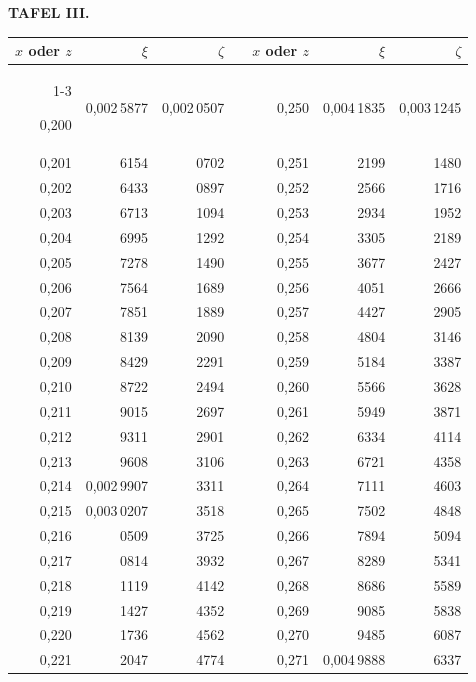\endgroup
\clearpage
{}
\begingroup
\centering
\fontsize{9}{9}\selectfont
\setlength{\tabcolsep}{8pt}
\renewcommand{\arraystretch}{1}
\setlength{\parskip}{0pt}
\textbf{TAFEL III.}
\par\vspace{7pt}
\begin{tabular}{|r|r|r|@{}p{9pt}@{}|r|r|r|}
\hline
\rule{0pt}{8.5pt}\(x\) oder \(z\) & \(\xi\) & \(\zeta\) & & \(x\) oder \(z\) & \(\xi\) & \(\zeta\) \\
\cline{1-3}\cline{5-7}
\rule{0pt}{8.5pt}0,200 & 0,002\,5877 & 0,002\,0507 &  & 0,250 & 0,004\,1835 & 0,003\,1245 \\
0,201 & 6154 & 0702 &  & 0,251 & 2199 & 1480 \\
0,202 & 6433 & 0897 &  & 0,252 & 2566 & 1716 \\
0,203 & 6713 & 1094 &  & 0,253 & 2934 & 1952 \\
0,204 & 6995 & 1292 &  & 0,254 & 3305 & \llap{\raisebox{1.6ex}{.}\hspace{.1em}}2189 \\
0,205 & 7278 & 1490 &  & 0,255 & 3677 & 2427 \\[3pt]
0,206 & 7564 & 1689 &  & 0,256 & 4051 & 2666 \\
0,207 & 7851 & 1889 &  & 0,257 & 4427 & 2905 \\
0,208 & 8139 & 2090 &  & 0,258 & 4804 & 3146 \\
0,209 & 8429 & 2291 &  & 0,259 & 5184 & 3387 \\
0,210 & 8722 & 2494 &  & 0,260 & 5566 & 3628 \\[3pt]
0,211 & 9015 & 2697 &  & 0,261 & 5949 & 3871 \\
0,212 & 9311 & 2901 &  & 0,262 & 6334 & 4114 \\
0,213 & 9608 & 3106 &  & 0,263 & 6721 & 4358 \\
0,214 & 0,002\,9907 & 3311 &  & 0,264 & 7111 & 4603 \\
0,215 & 0,003\,0207 & 3518 &  & 0,265 & 7502 & 4848 \\[3pt]
0,216 & 0509 & 3725 &  & 0,266 & 7894 & 5094 \\
0,217 & 0814 & 3932 &  & 0,267 & 8289 & 5341 \\
0,218 & 1119 & 4142 &  & 0,268 & 8686 & 5589 \\
0,219 & 1427 & 4352 &  & 0,269 & 9085 & 5838 \\
0,220 & 1736 & 4562 &  & 0,270 & 9485 & 6087 \\[3pt]
0,221 & 2047 & 4774 &  & 0,271 & 0,004\,9888 & 6337 \\

\end{tabular}
